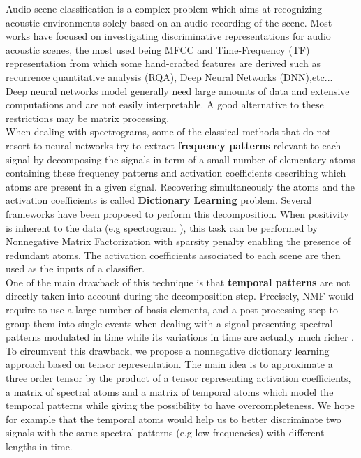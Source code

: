 \documentclass{article}
\begin{document}
Audio scene classification is a complex problem
which aims at recognizing acoustic environments
solely based on an audio recording of the scene. Most works
have focused on investigating discriminative representations
for audio acoustic scenes, the most used being MFCC and Time-Frequency (TF) representation from which some hand-crafted features are derived such as recurrence quantitative analysis (RQA)\cite{refRQA}, Deep Neural Networks (DNN)\cite{refDNN},etc...
\\
Deep neural networks model generally need large amounts of data and extensive computations\cite{Deepproblem} and are not easily interpretable. A good alternative to these restrictions may be matrix processing.
\\
When dealing with spectrograms, some of the  classical methods that do not resort to neural networks try to extract \textbf{frequency patterns} relevant to each signal by decomposing the signals in term of a small number of elementary atoms containing these frequency patterns and activation coefficients describing which atoms are present in a given signal. Recovering simultaneously the atoms and the activation coefficients is called \textbf{Dictionary Learning} problem.
Several frameworks have been proposed to perform this decomposition. When positivity is inherent to the data (e.g spectrogram ), this task can be performed by Nonnegative Matrix Factorization with sparsity penalty enabling the presence of redundant atoms. The activation coefficients associated to each scene are then used as the inputs of a classifier.
\\
One of the main drawback of this technique is that \textbf{temporal patterns} are not directly taken into account during the decomposition step. Precisely, NMF would require to use a large number of basis elements, and a  post-processing step
to group them into single events when dealing with a signal presenting spectral patterns modulated in time  while its variations
in time are actually much richer \cite{ProblemNMF}.
To circumvent this drawback, we propose a nonnegative dictionary learning approach based on tensor representation. The main idea is to approximate a three order tensor by the product of a tensor representing activation coefficients, a matrix of spectral atoms and a matrix of temporal atoms which model the temporal patterns while giving the possibility to have overcompleteness. We hope for example that the temporal atoms would help us to better discriminate two signals with the same spectral patterns (e.g low frequencies) with different lengths in time.
\end{document}
